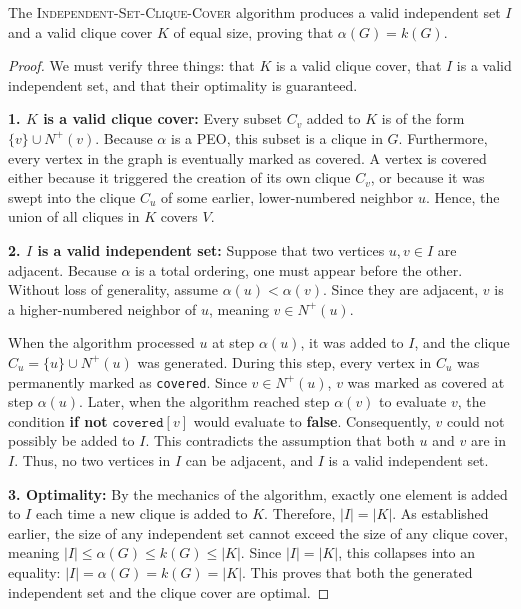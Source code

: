 \begin{theorem}
The \textsc{Independent-Set-Clique-Cover} algorithm produces a valid independent set $I$ and a valid clique cover $K$ of equal size, proving that $\alpha(G) = k(G)$.
\end{theorem}
\begin{proof}
We must verify three things: that $K$ is a valid clique cover, that $I$ is a valid independent set, and that their optimality is guaranteed.

\textbf{1. $K$ is a valid clique cover:} Every subset $C_v$ added to $K$ is of the form $\{v\} \cup N^+(v)$. Because $\alpha$ is a PEO, this subset is a clique in $G$. Furthermore, every vertex in the graph is eventually marked as covered. A vertex is covered either because it triggered the creation of its own clique $C_v$, or because it was swept into the clique $C_u$ of some earlier, lower-numbered neighbor $u$. Hence, the union of all cliques in $K$ covers $V$.

\textbf{2. $I$ is a valid independent set:} Suppose that two vertices $u, v \in I$ are adjacent. Because $\alpha$ is a total ordering, one must appear before the other. Without loss of generality, assume $\alpha(u) < \alpha(v)$. Since they are adjacent, $v$ is a higher-numbered neighbor of $u$, meaning $v \in N^+(u)$.

When the algorithm processed $u$ at step $\alpha(u)$, it was added to $I$, and the clique $C_u = \{u\} \cup N^+(u)$ was generated. During this step, every vertex in $C_u$ was permanently marked as \texttt{covered}. Since $v \in N^+(u)$, $v$ was marked as covered at step $\alpha(u)$. Later, when the algorithm reached step $\alpha(v)$ to evaluate $v$, the condition \textbf{if not} $\texttt{covered}[v]$ would evaluate to \textbf{false}. Consequently, $v$ could not possibly be added to $I$. This contradicts the assumption that both $u$ and $v$ are in $I$. Thus, no two vertices in $I$ can be adjacent, and $I$ is a valid independent set.

\textbf{3. Optimality:} By the mechanics of the algorithm, exactly one element is added to $I$ each time a new clique is added to $K$. Therefore, $|I| = |K|$. As established earlier, the size of any independent set cannot exceed the size of any clique cover, meaning $|I| \le \alpha(G) \le k(G) \le |K|$. Since $|I| = |K|$, this collapses into an equality: $|I| = \alpha(G) = k(G) = |K|$. This proves that both the generated independent set and the clique cover are optimal.
\end{proof}

